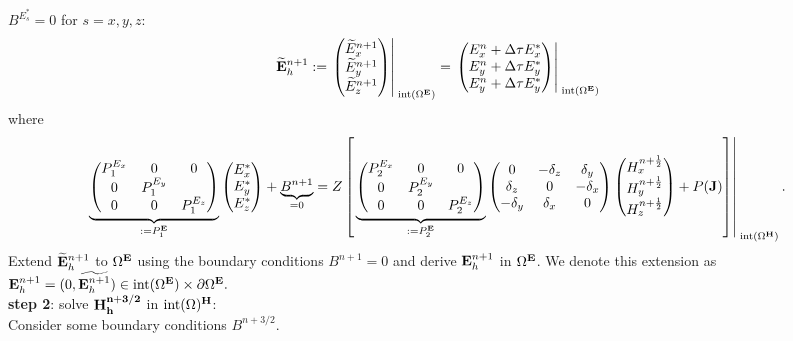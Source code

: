 \documentclass[12pt,reqno]{amsart}
\newcommand{\e}{{\bf E}}
\newcommand{\h}{{\bf H}}
\theoremstyle{definition}
\numberwithin{equation}{section}
\newcommand{\intr}[1]{\mathrm{int}(#1)}
\def\Gw{\Omega}     \def\Gx{\Xi}         \def\Gy{\Psi}
\begin{document}
	 $B^{E_s^*}=0$ for $s=x,y,z$: \\[2mm]
	$$
	\widetilde{\e}_h^{n+1}:=
	\left.
	\begin{pmatrix}
		\widetilde{E}_x^{n+1}\\
		\widetilde{E}_y^{n+1}\\
		\widetilde{E}_z^{n+1}
	\end{pmatrix}\right|_{\; \intr{\Gw^{\e}}}^{\;}=
\left.
	\begin{pmatrix}
		E_x^n+\Delta \tau E_x^{*}\\
		E_y^n+\Delta \tau E_y^{*}\\
		E_y^n+\Delta \tau E_y^{*}
	\end{pmatrix}\right|_{\; \intr{\Gw^{\e}}}^{\;}
	$$
	where 
	$$
	\underbrace{
	\begin{pmatrix}
		P_1^{E_x} & 0&0 \\
		0 & P_1^{E_y} &\\
		0&0&P_1^{E_z} 
	\end{pmatrix}
}_{:=P_1^\e}
	\begin{pmatrix}
		E_x^{*}\\
		E_y^{*} \\
		E_z^{*}
	\end{pmatrix}+\underbrace{B^{n+1}}_{=0}=Z
\left [ \left.
	\underbrace{
	\begin{pmatrix}
		P_2^{E_x} & 0&0 \\
		0 & P_2^{E_y} &\\
		0&0&P_2^{E_z} 
	\end{pmatrix}
}_{:=P_2^\e}
	\begin{pmatrix}
		0& -\delta_z & \delta _y\\
		\delta_z&0&-\delta_x\\
		-\delta_y&\delta_x&0
	\end{pmatrix}
	\begin{pmatrix}
		H_x^{n+\frac{1}{2}}\\
		H_y^{n+\frac{1}{2}}\\
		H_z^{n+\frac{1}{2}}
	\end{pmatrix}+P({\bf J})\right]\right|_{\; \intr{\Gw^{\h}}}^{\;}.
	$$
	Extend $\widetilde{\e}_h^{n+1}$
to $\Gw^\e$ using the boundary conditions $B^{n+1}=0$ and derive 
$\e_h^{n+1}$ in $\Gw^\e$. 
We denote this extension as $\e_h^{n+1}=(0,\widetilde{\e_h^{n+1}})\in 
\intr{\Gw^\e}\times \partial \Gw^{\e}.
$ 
	\\[1mm]
	{\bf step 2}: solve $\bf{H}^{n+3/2}_h$ in $\intr\Gw^\h$: \\[2mm]
	Consider some  boundary conditions $B^{n+3/2}$.
\end{document}

